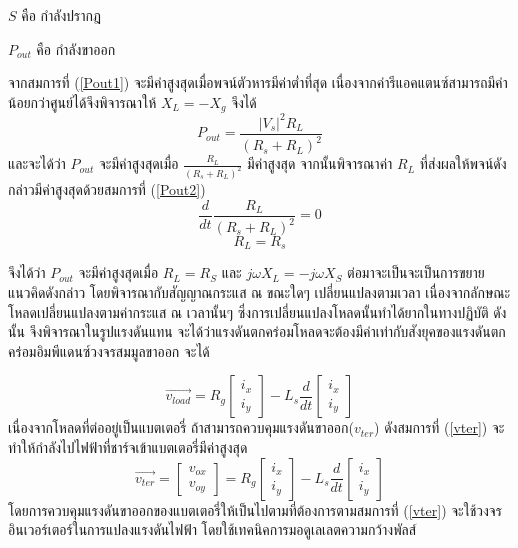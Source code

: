 \documentclass[11pt,a4paper]{article}
\begin{document}
$S$ คือ กำลังปรากฎ

$P_{out}$ คือ กำลังขาออก

จากสมการที่ ({\ref{Pout1}}) จะมีค่าสูงสุดเมื่อพจน์ตัวหารมีค่าต่ำที่สุด เนื่องจากค่ารีแอคแตนซ์สามารถมีค่าน้อยกว่าศูนย์ได้จึงพิจารณาให้ $X_{L} = - X_{g}$ จึงได้
\begin{equation}
    P_{out}  = \frac{|V_{s}|^2 R_{L} }{ (R_{s} + R_{L})^2 }
\end{equation}
และจะได้ว่า $P_{out}$ จะมีค่าสูงสุดเมื่อ $\frac{ R_{L} }{ (R_{s} + R_{L})^2 }$ มีค่าสูงสุด จากนั้นพิจารณาค่า $R_{L}$ ที่ส่งผลให้พจน์ดังกล่าวมีค่าสูงสุดด้วยสมการที่ (\ref{Pout2})
\begin{equation}\label{Pout2}
    \frac{d}{dt} \frac{ R_{L} }{ (R_{s} + R_{L})^2 } = 0
\end{equation}
\begin{equation}
     R_{L} = R_{s} 
\end{equation}


จึงได้ว่า $P_{out}$ จะมีค่าสูงสุดเมื่อ $R_{L} = R_{S}$ และ $j\omega X_{L} = -j\omega X_{S}$ 
ต่อมาจะเป็นจะเป็นการขยายแนวคิดดังกล่าว โดยพิจารณากับสัญญาณกระแส ณ ขณะใดๆ เปลี่ยนแปลงตามเวลา 
เนื่องจากลักษณะโหลดเปลี่ยนแปลงตามค่ากระแส ณ เวลานั้นๆ ซึ่งการเปลี่ยนแปลงโหลดนั้นทำได้ยากในทางปฏิบัติ ดังนั้น
จึงพิจารณาในรูปแรงดันแทน จะได้ว่าแรงดันตกคร่อมโหลดจะต้องมีค่าเท่ากับสังยุคของแรงดันตกคร่อมอิมพีแดนซ์วงจรสมมูลขาออก จะได้

\begin{equation}
    \vec{v_{load}}  = R_{g}
    \begin{bmatrix}
        i_{x} \\i_{y}
    \end{bmatrix} - L_{s}\frac{d}{dt}
    \begin{bmatrix}
        i_{x} \\i_{y}
    \end{bmatrix}
\end{equation}
เนื่องจากโหลดที่ต่ออยู่เป็นแบตเตอรี่ ถ้าสามารถควบคุมแรงดันขาออก($v_{ter}$) ดังสมการที่ (\ref{vter}) จะทำให้กำลังไปไฟฟ้าที่ชาร์จเข้าแบตเตอรี่มีค่าสูงสุด
\begin{equation}\label{vter}
    \vec{v_{ter}} =
    \begin{bmatrix}
        v_{ox} \\v_{oy}
    \end{bmatrix} = R_{g}
    \begin{bmatrix}
        i_{x} \\i_{y}
    \end{bmatrix} - L_{s}\frac{d}{dt}
    \begin{bmatrix}
        i_{x} \\i_{y}
    \end{bmatrix}
\end{equation}
โดยการควบคุมแรงดันขาออกของแบตเตอรี่ให้เป็นไปตามที่ต้องการตามสมการที่ (\ref{vter}) จะใช้วงจรอินเวอร์เตอร์ในการแปลงแรงดันไฟฟ้า โดยใช้เทคนิคการมอดูเลเลตความกว้างพัลส์
\end{document}
